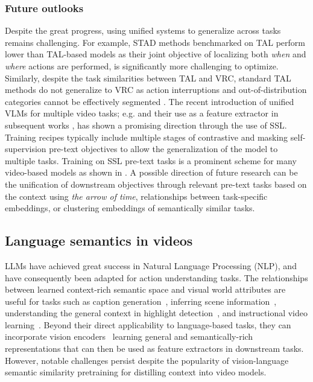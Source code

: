 \subsubsection{Future outlooks}

Despite the great progress, using unified systems to generalize across tasks remains challenging. For example, STAD methods \citep{dai2021pdan,tirupattur2021modeling} benchmarked on TAL perform lower than TAL-based models as their joint objective of localizing both \emph{when} and \emph{where} actions are performed, is significantly more challenging to optimize. Similarly, despite the task similarities between TAL and VRC, standard TAL methods do not generalize to VRC as action interruptions and out-of-distribution categories cannot be effectively segmented \citep{hu2022transrac,sinha2024every}. The recent introduction of unified VLMs for multiple video tasks; e.g. \citep{wang2024internvideo2} and their use as a feature extractor in subsequent works \citep{chen2024video}, has shown a promising direction through the use of SSL. Training recipes typically include multiple stages of contrastive and masking self-supervision pre-text objectives to allow the generalization of the model to multiple tasks. Training on SSL pre-text tasks is a prominent scheme for many video-based models as shown in . A possible direction of future research can be the unification of downstream objectives through relevant pre-text tasks based on the context using \emph{the arrow of time}, relationships between task-specific embeddings, or clustering embeddings of semantically similar tasks.     




\subsection{Language semantics in videos}
\label{sec:recognition::language}

LLMs have achieved great success in Natural Language Processing (NLP), and have consequently been adapted for action understanding tasks. The relationships between learned context-rich semantic space and visual world attributes are useful for tasks such as caption generation~\citep{seo2022end,sun2019videobert,wang2024omnivid}, inferring scene information~\citep{anderson2018vision,cheng2024egothink}, understanding the general context in highlight detection~\citep{lei2021detecting}, and instructional video learning~\citep{miech2020end}. Beyond their direct applicability to language-based tasks, they can incorporate vision encoders~\citep{ashutosh2023hiervl,fu2021violet,kahatapitiya2024victr,song2024moviechat,xu2021videoclip,zellers2021merlot} learning general and semantically-rich representations that can then be used as feature extractors in downstream tasks. However, notable challenges persist despite the popularity of vision-language semantic similarity pretraining for distilling context into video models. 

